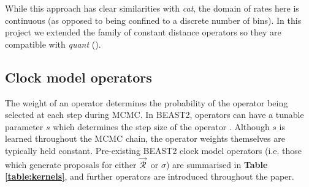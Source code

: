 \documentclass[10pt,letterpaper]{article}
\begin{document}
While this approach has clear similarities with \textit{cat}, the domain of rates here is continuous (as opposed to being confined to a discrete number of bins).
In this project we extended the family of constant distance operators  \cite{zhang2020improving} so they are compatible with \textit{quant} (\textbf{}). 
















\clearpage
\subsection*{Clock model operators}
\label{sect:clockModelOperators}

The weight of an operator determines the probability of the operator being selected at each step during MCMC.
In BEAST2, operators can have a tunable parameter $s$ which determines the step size of the operator \cite{bouckaert2019beast}. 
Although $s$ is learned throughout the MCMC chain, the operator weights themselves are typically held constant.
Pre-existing BEAST2 clock model operators (i.e. those which generate proposals for either $\vec{\mathcal{R}}^{\,}$ or $\sigma$) are summarised in \textbf{Table \ref{table:kernels}}, and further operators are introduced throughout the paper.
\end{document}

